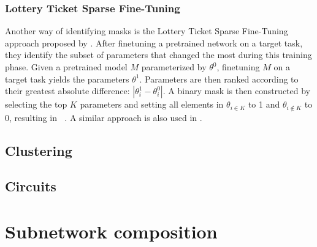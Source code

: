 \documentclass[11pt]{article}
\DeclareMathOperator*{\subnetwork}{\hat{\theta_i}}
\begin{document}
\subsubsection{Lottery Ticket Sparse Fine-Tuning}
Another way of identifying masks is the Lottery Ticket Sparse Fine-Tuning approach proposed by \citet{ansell-etal-2022-composable}. After finetuning a pretrained network on a target task, they identify the subset of parameters that changed the most during this training phase. Given a pretrained model $M$ parameterized by $\theta^0$, finetuning $M$ on a target task yields the parameters $\theta^1$. Parameters are then ranked according to their greatest absolute difference: $|\theta^1_i - \theta^0_i|$. A binary mask is then constructed by selecting the top $K$ parameters and setting all elements in $\theta_{i \in K}$ to 1 and $\theta_{i \notin K}$ to 0, resulting in $\subnetwork$. A similar approach is also used in \citet{frankle2018the}.

\subsection{Clustering}
\citet{watanabe2019interpreting, casper2022graphical}
\subsection{Circuits}
\citep{conmy2023towards, nanda2023progress, wang2023interpretability}
\section{Subnetwork composition}
\newpage

\end{document}

